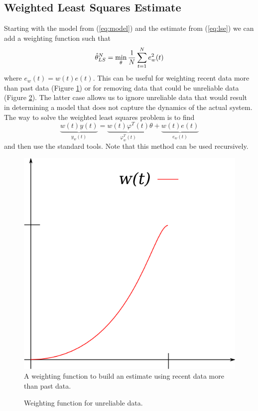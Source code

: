 \subsection{Weighted Least Squares Estimate}
Starting with the model from (\ref{eq:model}) and the estimate from (\ref{eq:lse}) we can add a weighting function such that
$$\hat{\theta}_{LS}^N = \min_\theta \frac{1}{N}\sum_{t=1}^N e_w^2(t)$$
where $e_w(t)=w(t)e(t)$. This can be useful for weighting recent data more than past data (Figure \ref{fig:09wRecent}) or for removing data that could be unreliable data (Figure \ref{fig:09bad}). The latter case allows us to ignore unreliable data that would result in determining a model that does not capture the dynamics of the actual system. The way to solve the weighted least squares problem is to find
$$\underbrace{w(t)y(t)}_{y_w(t)} = \underbrace{w(t)\varphi^T(t)}_{\varphi_w^T(t)}\theta + \underbrace{w(t)e(t)}_{e_w(t)}$$
and then use the standard tools. Note that this method can be used recursively.

\begin{figure}[ht!]
  \centering
  \includegraphics[width=.25\textwidth]{images/09wRecent}
  \caption{A weighting function to build an estimate using recent data more than past data.}
  \label{fig:09wRecent}
\end{figure}

\begin{figure}[ht!]
  \centering
   \hfill
   \hfill
  \caption{Weighting function for unreliable data.}
  \label{fig:09bad}
\end{figure}

